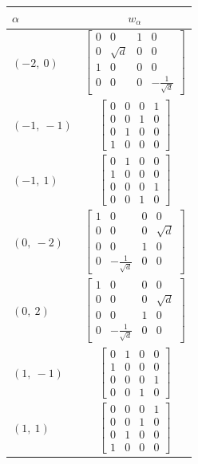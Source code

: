 \documentclass[11pt]{article}
\newcommand{\noi}{\noindent}
\theoremstyle{definition}
\begin{document}
\noi \noindent \begin{longtable}{|l|c|}
    \hline
    $\alpha$ & $w_\alpha$ \\
    \hline
    \endhead
    $\left( -2, \  0\right)$ & ${\left[\begin{matrix}0 & 0 & 1 & 0\\0 & \sqrt{d} & 0 & 0\\1 & 0 & 0 & 0\\0 & 0 & 0 & - \frac{1}{\sqrt{d}}\end{matrix}\right]}$ \\
    \hline
    $\left( -1, \  -1\right)$ & ${\left[\begin{matrix}0 & 0 & 0 & 1\\0 & 0 & 1 & 0\\0 & 1 & 0 & 0\\1 & 0 & 0 & 0\end{matrix}\right]}$ \\
    \hline
    $\left( -1, \  1\right)$ & ${\left[\begin{matrix}0 & 1 & 0 & 0\\1 & 0 & 0 & 0\\0 & 0 & 0 & 1\\0 & 0 & 1 & 0\end{matrix}\right]}$ \\
    \hline
    $\left( 0, \  -2\right)$ & ${\left[\begin{matrix}1 & 0 & 0 & 0\\0 & 0 & 0 & \sqrt{d}\\0 & 0 & 1 & 0\\0 & - \frac{1}{\sqrt{d}} & 0 & 0\end{matrix}\right]}$ \\
    \hline
    $\left( 0, \  2\right)$ & ${\left[\begin{matrix}1 & 0 & 0 & 0\\0 & 0 & 0 & \sqrt{d}\\0 & 0 & 1 & 0\\0 & - \frac{1}{\sqrt{d}} & 0 & 0\end{matrix}\right]}$ \\
    \hline
    $\left( 1, \  -1\right)$ & ${\left[\begin{matrix}0 & 1 & 0 & 0\\1 & 0 & 0 & 0\\0 & 0 & 0 & 1\\0 & 0 & 1 & 0\end{matrix}\right]}$ \\
    \hline
    $\left( 1, \  1\right)$ & ${\left[\begin{matrix}0 & 0 & 0 & 1\\0 & 0 & 1 & 0\\0 & 1 & 0 & 0\\1 & 0 & 0 & 0\end{matrix}\right]}$ \\

\end{longtable}
\end{document}
